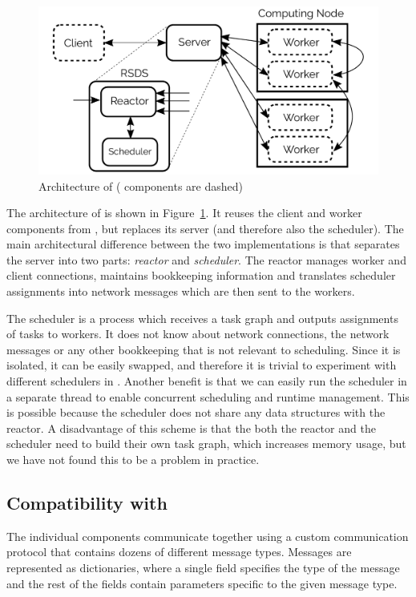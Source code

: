 \begin{figure}
	\centering
	\includegraphics[width=0.8\linewidth]{./imgs/rsds/rsds-architecture}
	\caption{Architecture of \rsds{} (\dask{} components are dashed)}
	\label{fig:rsds-architecture}
\end{figure}

The architecture of \rsds{} is shown in Figure~\ref{fig:rsds-architecture}. It
reuses the client and worker components from \dask{}, but replaces its server
(and therefore also the scheduler). The main architectural difference between the two
implementations is that \rsds{} separates the server into two parts:
\emph{reactor} and \emph{scheduler}. The reactor manages worker and client
connections, maintains bookkeeping information and translates scheduler assignments into
\dask{} network messages which are then sent to the workers.

The scheduler is a process which receives a task graph and outputs assignments of tasks to workers.
It does not know about network connections, the \dask{} network messages or any
other bookkeeping that is not relevant to scheduling. Since it is isolated, it can be easily
swapped, and therefore it is trivial to experiment with different schedulers in
\rsds{}. Another benefit is that we can easily run the scheduler in a separate
thread to enable concurrent scheduling and runtime management. This is possible because the
scheduler does not share any data structures with the reactor. A disadvantage of this scheme is
that the both the reactor and the scheduler need to build their own task graph, which increases
memory usage, but we have not found this to be a problem in practice.

\subsection*{Compatibility with \dask{}}
The individual \dask{} components communicate together using a custom
communication protocol that contains dozens of different message types. Messages are represented as
dictionaries, where a single field specifies the type of the message and the rest of the fields
contain parameters specific to the given message type.

